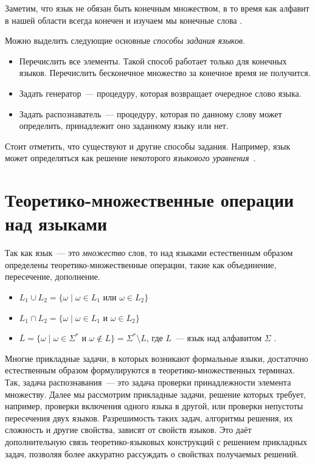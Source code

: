 Заметим, что язык не обязан быть конечным множеством, в то время как алфавит в нашей области всегда конечен%
и изучаем мы конечные слова%
.

Можно выделить следующие основные \emph{способы задания языков}.
\begin{itemize}
    \item Перечислить все элементы.
          Такой способ работает только для конечных языков.
          Перечислить бесконечное множество за конечное время не получится.
    \item Задать генератор~--- процедуру, которая возвращает очередное слово языка.
    \item Задать распознаватель~--- процедуру, которая по данному слову может определить, принадлежит оно заданному языку или нет.
\end{itemize}

Стоит отметить, что существуют и другие способы задания.
Например, язык может определяться как решение некоторого \emph{языкового уравнения}~.

\section{Теоретико-множественные операции над языками}

Так как язык~--- это \emph{множество} слов, то над языками естественным образом определены теоретико-множественные операции, такие как объединение, пересечение, дополнение.
\begin{itemize}
    \item $L_1 \cup L_2 = \{ \omega \mid \omega \in L_1 \text{ или } \omega \in L_2\}$
    \item $L_1 \cap L_2 = \{ \omega \mid \omega \in L_1 \text{ и } \omega \in L_2\}$
    \item $\overline{L} = \{ \omega \mid \omega \in \Sigma^* \text{ и } \omega \notin L\} = \Sigma^* \setminus L$, где $L$~--- язык над алфавитом $\Sigma$ .
\end{itemize}

Многие прикладные задачи, в которых возникают формальные языки, достаточно естественным образом формулируются в теоретико-множественных терминах.
Так, задача распознавания~--- это задача проверки принадлежности элемента множеству.
Далее мы рассмотрим прикладные задачи, решение которых требует, например, проверки включения одного языка в другой, или проверки непустоты пересечения двух языков.
Разрешимость таких задач, алгоритмы решения, их сложность и другие свойства, зависят от свойств языков.
Это даёт дополнительную связь теоретико-языковых конструкций с решением прикладных задач, позволяя более аккуратно рассуждать о свойствах получаемых решений.

